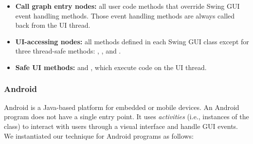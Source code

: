 \begin{myindentpar}{-2mm}
\begin{itemize}
\tinystep

\item \textbf{Call graph entry nodes:} all user code methods that override
Swing GUI event handling methods. Those event handling methods are always
called back from the UI thread.

\tinystep

\item \textbf{UI-accessing nodes:} %
all methods defined in each Swing GUI class except for three thread-safe
methods: , , and .

\tinystep

\item \textbf{Safe UI methods:}  
 and , which execute code on the UI thread.

\end{itemize}
\end{myindentpar}

\smallstep

\tinystep
\subsubsection{Android}

Android is a Java-based platform for embedded or mobile devices. 
An Android program does not have a single entry point.
It uses \textit{activities}
(i.e., instances of the  class)
to interact with users through a visual interface and handle GUI events.
We instantiated our technique for Android programs as follows:


